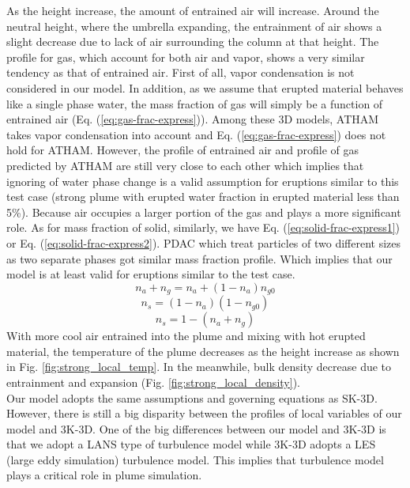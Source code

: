 \documentclass[journal abbreviation, manuscript]{copernicus}
\begin{document}
As the height increase, the amount of entrained air will increase. Around the neutral height, where the umbrella expanding, the entrainment of air shows a slight decrease due to lack of air surrounding the column at that height. The profile for gas, which account for both air and vapor, shows a very similar tendency as that of entrained air. First of all, vapor condensation is not considered in our model. In addition, as we assume that erupted material behaves like a single phase water, the mass fraction of gas will simply be a function of entrained air (Eq. (\ref{eq:gas-frac-express})). Among these 3D models, ATHAM takes vapor condensation into account and Eq. (\ref{eq:gas-frac-express}) does not hold for ATHAM. However, the profile of entrained air and profile of gas predicted by ATHAM are still very close to each other which implies that ignoring of water phase change is a valid assumption for eruptions similar to this test case (strong plume with erupted water fraction in erupted material less than 5\%). Because air occupies a larger portion of the gas and plays a more significant role. As for mass fraction of solid, similarly, we have Eq. (\ref{eq:solid-frac-express1}) or Eq. (\ref{eq:solid-frac-express2}). PDAC which treat particles of two different sizes as two separate phases got similar mass fraction profile. Which implies that our model is at least valid for eruptions similar to the test case. 
\begin{equation}
n_a + n_g = n_a + (1-n_a) n_{g0}
\label{eq:gas-frac-express}
\end{equation}
\begin{equation}
n_s = (1 - n_a) (1- n_{g0})
\label{eq:solid-frac-express1}
\end{equation}
\begin{equation}
n_s = 1 - (n_a + n_g)
\label{eq:solid-frac-express2}
\end{equation}
With more cool air entrained into the plume and mixing with hot erupted material, the temperature of the plume decreases as the height increase as shown in Fig. \ref{fig:strong_local_temp}. In the meanwhile, bulk density decrease due to entrainment and expansion (Fig. \ref{fig:strong_local_density}).\\
Our model adopts the same assumptions and governing equations as SK-3D. However, there is still a big disparity between the profiles of local variables of our model and 3K-3D. One of the big differences between our model and 3K-3D is that we adopt a LANS type of turbulence model while 3K-3D adopts a LES (large eddy simulation) turbulence model. This implies that turbulence model plays a critical role in plume simulation.
\end{document}
